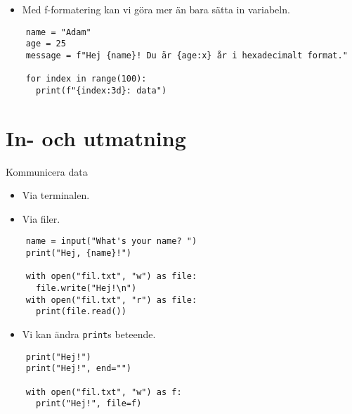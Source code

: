 \begin{frame}[fragile]
  \begin{remark}
    \begin{itemize}
      \item Med f-formatering kan vi göra mer än bara sätta in variabeln.
    \end{itemize}
  \end{remark}

  \begin{verbatim}
    name = "Adam"
    age = 25
    message = f"Hej {name}! Du är {age:x} år i hexadecimalt format."

    for index in range(100):
      print(f"{index:3d}: data")
  \end{verbatim}
\end{frame}


\section{In- och utmatning}

\begin{frame}[fragile]
  \begin{block}{Kommunicera data}
    \begin{itemize}
      \item Via terminalen.
      \item Via filer.
    \end{itemize}
  \end{block}

  \begin{verbatim}
    name = input("What's your name? ")
    print("Hej, {name}!")

    with open("fil.txt", "w") as file:
      file.write("Hej!\n")
    with open("fil.txt", "r") as file:
      print(file.read())
  \end{verbatim}
\end{frame}

\begin{frame}[fragile]
  \begin{remark}
    \begin{itemize}
      \item Vi kan ändra \texttt{print}s beteende.
    \end{itemize}
  \end{remark}

  \begin{verbatim}
    print("Hej!")
    print("Hej!", end="")

    with open("fil.txt", "w") as f:
      print("Hej!", file=f)
  \end{verbatim}
\end{frame}

